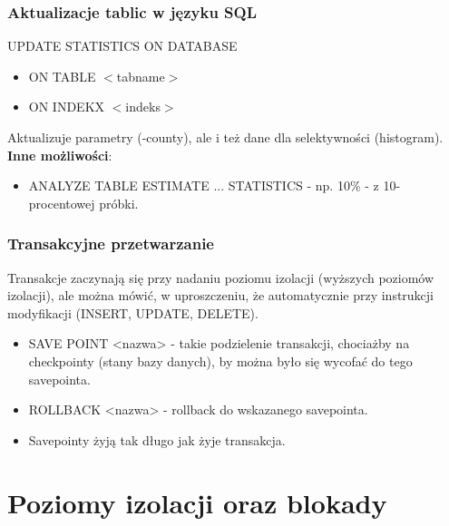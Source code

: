 \documentclass[a4paper,twoside]{article}
\begin{document}
  	\section*{Aktualizacje tablic w języku SQL} \noindent
  	UPDATE STATISTICS ON DATABASE
  	\begin{itemize}
  		\item ON TABLE $ < $tabname$ > $
  		\item ON INDEKX $ < $indeks$ > $
  	\end{itemize}
  	Aktualizuje parametry (-county), ale i też dane dla selektywności (histogram).\\
  	\textbf{Inne możliwości}:
  	\begin{itemize}
  		\item ANALYZE TABLE ESTIMATE ... STATISTICS - np. 10\% - z 10-procentowej próbki.
  	\end{itemize}
  	
	\section*{Transakcyjne przetwarzanie} \noindent
	Transakcje zaczynają się przy nadaniu poziomu izolacji (wyższych poziomów izolacji), ale można mówić, w uproszczeniu, że automatycznie przy instrukcji modyfikacji (INSERT, UPDATE, DELETE).
	\begin{itemize}
		\item SAVE POINT <nazwa> - takie podzielenie transakcji, chociażby na checkpointy (stany bazy danych), by można było się wycofać do tego savepointa.
		\item ROLLBACK <nazwa> - rollback do wskazanego savepointa.
		\item Savepointy żyją tak długo jak żyje transakcja.
	\end{itemize}
  	
  	\part*{Poziomy izolacji oraz blokady}
  	
\end{document}
